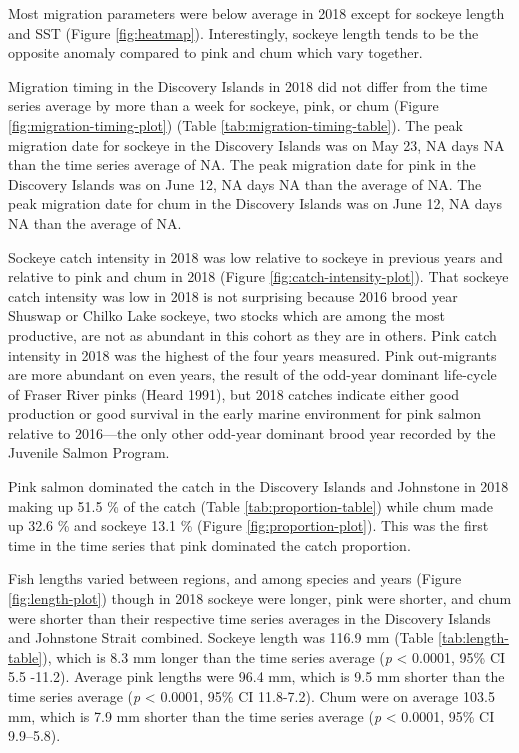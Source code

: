 \documentclass[fleqn,10pt]{wlpeerj} %
\begin{document}
Most migration parameters were below average in 2018 except for sockeye length and SST (Figure \ref{fig:heatmap}). Interestingly, sockeye length tends to be the opposite anomaly compared to pink and chum which vary together.

Migration timing in the Discovery Islands in 2018 did not differ from the time series average by more than a week for sockeye, pink, or chum (Figure \ref{fig:migration-timing-plot}) (Table \ref{tab:migration-timing-table}). The peak migration date for sockeye in the Discovery Islands was on May 23, NA days NA than the time series average of NA. The peak migration date for pink in the Discovery Islands was on June 12, NA days NA than the average of NA. The peak migration date for chum in the Discovery Islands was on June 12, NA days NA than the average of NA.

Sockeye catch intensity in 2018 was low relative to sockeye in previous years and relative to pink and chum in 2018 (Figure \ref{fig:catch-intensity-plot}). That sockeye catch intensity was low in 2018 is not surprising because 2016 brood year Shuswap or Chilko Lake sockeye, two stocks which are among the most productive, are not as abundant in this cohort as they are in others. Pink catch intensity in 2018 was the highest of the four years measured. Pink out-migrants are more abundant on even years, the result of the odd-year dominant life-cycle of Fraser River pinks (Heard 1991), but 2018 catches indicate either good production or good survival in the early marine environment for pink salmon relative to 2016---the only other odd-year dominant brood year recorded by the Juvenile Salmon Program.

Pink salmon dominated the catch in the Discovery Islands and Johnstone in 2018 making up 51.5 \% of the catch (Table \ref{tab:proportion-table}) while chum made up 32.6 \% and sockeye 13.1 \% (Figure \ref{fig:proportion-plot}). This was the first time in the time series that pink dominated the catch proportion.

Fish lengths varied between regions, and among species and years (Figure \ref{fig:length-plot}) though in 2018 sockeye were longer, pink were shorter, and chum were shorter than their respective time series averages in the Discovery Islands and Johnstone Strait combined. Sockeye length was 116.9 mm (Table \ref{tab:length-table}), which is 8.3 mm longer than the time series average (\emph{p} \textless{} 0.0001, 95\% CI 5.5 -11.2). Average pink lengths were 96.4 mm, which is 9.5 mm shorter than the time series average (\emph{p} \textless{} 0.0001, 95\% CI 11.8-7.2). Chum were on average 103.5 mm, which is 7.9 mm shorter than the time series average (\emph{p} \textless{} 0.0001, 95\% CI 9.9--5.8).
\end{document}
